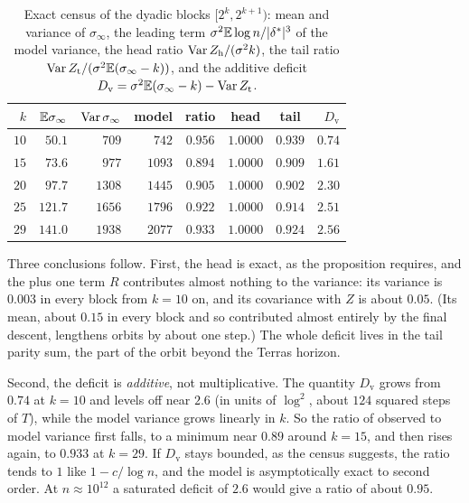 \begin{table}[ht]
\centering\small
\caption{Exact census of the dyadic blocks $[2^k,2^{k+1})$: mean and variance of
$\sigma_\infty$, the leading term $\sigma^2\mathbb{E}\log n/|\delta^{*}|^3$ of the model variance, the head ratio $\operatorname{Var}
Z_{\mathrm h}/(\sigma^2k)$, the tail ratio $\operatorname{Var} Z_{\mathrm t}/(\sigma^2\mathbb{E}(\sigma_\infty-k))$,
and the additive deficit $D_{\mathrm v}=\sigma^2\mathbb{E}(\sigma_\infty-k)-\operatorname{Var} Z_{\mathrm t}$.}
\label{tab:ch3:missing}
\setlength{\tabcolsep}{4pt}
\begin{tabular}{@{}rrrrcccr@{}}
\toprule
$k$ & $\mathbb{E}\sigma_\infty$ & $\operatorname{Var}\sigma_\infty$ & model & ratio & head & tail & $D_{\mathrm v}$ \\
\midrule
$10$ & $50.1$ & $709$ & $742$ & $0.956$ & $1.0000$ & $0.939$ & $0.74$ \\
$15$ & $73.6$ & $977$ & $1093$ & $0.894$ & $1.0000$ & $0.909$ & $1.61$ \\
$20$ & $97.7$ & $1308$ & $1445$ & $0.905$ & $1.0000$ & $0.902$ & $2.30$ \\
$25$ & $121.7$ & $1656$ & $1796$ & $0.922$ & $1.0000$ & $0.914$ & $2.51$ \\
$29$ & $141.0$ & $1938$ & $2077$ & $0.933$ & $1.0000$ & $0.924$ & $2.56$ \\
\bottomrule
\end{tabular}
\end{table}

Three conclusions follow. First, the head is exact, as the proposition
requires, and the plus one term $R$ contributes almost nothing to the variance: its
variance is $0.003$ in every block from $k=10$ on, and its covariance with $Z$
is about $0.05$. (Its mean, about $0.15$ in every block and so contributed almost entirely by the final descent, lengthens orbits by about one step.) The whole deficit lives in the tail parity sum, the part of the
orbit beyond the Terras horizon.

Second, the deficit is \emph{additive}, not multiplicative. The quantity $D_{\mathrm v}$ grows
from $0.74$ at $k=10$ and levels off near $2.6$ (in units of $\log^2$, about
$124$ squared steps of $T$), while the model variance grows linearly in $k$. So
the ratio of observed to model variance first falls, to a minimum near $0.89$
around $k=15$, and then rises again, to $0.933$ at $k=29$. If $D_{\mathrm v}$ stays bounded,
as the census suggests, the ratio tends to $1$ like $1-c/\log n$, and the model is
asymptotically exact to second order. At $n\approx10^{12}$ a saturated deficit
of $2.6$ would give a ratio of about $0.95$.

